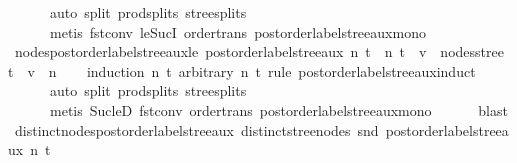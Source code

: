 \begin{isabellebody}
\ \ \ \ \ \ auto\ split{\isacharcolon}{\kern0pt}\ prod{\isachardot}{\kern0pt}splits\ stree{\isachardot}{\kern0pt}splits{\isacharcomma}{\kern0pt}\isanewline
\ \ \ \ \ \ {\isacharparenleft}{\kern0pt}metis\ fst{\isacharunderscore}{\kern0pt}conv\ le{\isacharunderscore}{\kern0pt}SucI\ order{\isachardot}{\kern0pt}trans\ postorder{\isacharunderscore}{\kern0pt}label{\isacharunderscore}{\kern0pt}stree{\isacharunderscore}{\kern0pt}aux{\isacharunderscore}{\kern0pt}mono{\isacharparenright}{\kern0pt}{\isacharplus}{\kern0pt}{\isacharparenright}{\kern0pt}%
\endisatagproof
{\isafoldproof}%
%
\isadelimproof
\isanewline
%
\endisadelimproof
\isanewline
{}\isamarkupfalse%
\ nodes{\isacharunderscore}{\kern0pt}postorder{\isacharunderscore}{\kern0pt}label{\isacharunderscore}{\kern0pt}stree{\isacharunderscore}{\kern0pt}aux{\isacharunderscore}{\kern0pt}le{\isacharcolon}{\kern0pt}\ {\isachardoublequoteopen}postorder{\isacharunderscore}{\kern0pt}label{\isacharunderscore}{\kern0pt}stree{\isacharunderscore}{\kern0pt}aux\ n\ t\ {\isacharequal}{\kern0pt}\ {\isacharparenleft}{\kern0pt}n{\isacharprime}{\kern0pt}{\isacharcomma}{\kern0pt}\ t{\isacharprime}{\kern0pt}{\isacharparenright}{\kern0pt}\ {\isasymLongrightarrow}\ v\ {\isasymin}\ nodes{\isacharunderscore}{\kern0pt}stree\ t{\isacharprime}{\kern0pt}\ {\isasymLongrightarrow}\ v\ {\isasymle}\ n{\isacharprime}{\kern0pt}{\isachardoublequoteclose}\isanewline
%
\isadelimproof
\ \ %
\endisadelimproof
%
\isatagproof
{}\isamarkupfalse%
\ {\isacharparenleft}{\kern0pt}induction\ n\ t\ arbitrary{\isacharcolon}{\kern0pt}\ n{\isacharprime}{\kern0pt}\ t{\isacharprime}{\kern0pt}\ rule{\isacharcolon}{\kern0pt}\ postorder{\isacharunderscore}{\kern0pt}label{\isacharunderscore}{\kern0pt}stree{\isacharunderscore}{\kern0pt}aux{\isachardot}{\kern0pt}induct{\isacharcomma}{\kern0pt}\isanewline
\ \ \ \ \ \ auto\ split{\isacharcolon}{\kern0pt}\ prod{\isachardot}{\kern0pt}splits\ stree{\isachardot}{\kern0pt}splits{\isacharcomma}{\kern0pt}\isanewline
\ \ \ \ \ \ metis\ Suc{\isacharunderscore}{\kern0pt}leD\ fst{\isacharunderscore}{\kern0pt}conv\ order{\isacharunderscore}{\kern0pt}trans\ postorder{\isacharunderscore}{\kern0pt}label{\isacharunderscore}{\kern0pt}stree{\isacharunderscore}{\kern0pt}aux{\isacharunderscore}{\kern0pt}mono{\isacharcomma}{\kern0pt}\isanewline
\ \ \ \ \ \ blast{\isacharparenright}{\kern0pt}%
\endisatagproof
{\isafoldproof}%
%
\isadelimproof
\isanewline
%
\endisadelimproof
\isanewline
{}\isamarkupfalse%
\ distinct{\isacharunderscore}{\kern0pt}nodes{\isacharunderscore}{\kern0pt}postorder{\isacharunderscore}{\kern0pt}label{\isacharunderscore}{\kern0pt}stree{\isacharunderscore}{\kern0pt}aux{\isacharcolon}{\kern0pt}\ {\isachardoublequoteopen}distinct{\isacharunderscore}{\kern0pt}stree{\isacharunderscore}{\kern0pt}nodes\ {\isacharparenleft}{\kern0pt}snd\ {\isacharparenleft}{\kern0pt}postorder{\isacharunderscore}{\kern0pt}label{\isacharunderscore}{\kern0pt}stree{\isacharunderscore}{\kern0pt}aux\ n\ t{\isacharparenright}{\kern0pt}{\isacharparenright}{\kern0pt}{\isachardoublequoteclose}\isanewline

\end{isabellebody}

